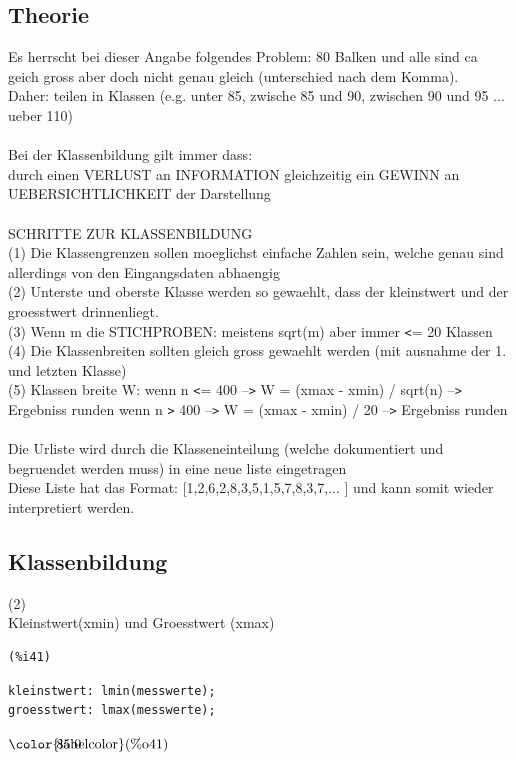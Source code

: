 \documentclass[12pt]{article}
\begin{document}
\subsection{Theorie}


Es herrscht bei dieser Angabe folgendes Problem: 80 Balken und alle sind ca geich gross aber doch nicht genau gleich (unterschied nach dem Komma). \\
Daher: teilen in Klassen (e.g. unter 85, zwische 85 und 90, zwischen 90 und 95 ... ueber 110)
\\ \\
Bei der Klassenbildung gilt immer dass: \\
    durch einen VERLUST an INFORMATION gleichzeitig ein GEWINN an UEBERSICHTLICHKEIT der Darstellung
\\ \\
SCHRITTE ZUR KLASSENBILDUNG \\
    (1) Die Klassengrenzen sollen moeglichst einfache Zahlen sein, welche genau sind allerdings von den Eingangsdaten abhaengig \\
    (2) Unterste und oberste Klasse werden so gewaehlt, dass der kleinstwert und der groesstwert drinnenliegt. \\
    (3) Wenn m die STICHPROBEN: meistens sqrt(m) aber immer \verb|<|= 20 Klassen \\
    (4) Die Klassenbreiten sollten gleich gross gewaehlt werden (mit ausnahme der 1. und letzten Klasse) \\
    (5) Klassen breite W:   wenn n \verb|<|= 400 --\verb|>| W = (xmax - xmin) / sqrt(n) --\verb|>| Ergebniss runden
                            wenn n \verb|>| 400 --\verb|>| W = (xmax - xmin) / 20 --\verb|>| Ergebniss runden
\\ \\
Die Urliste wird durch die Klasseneinteilung (welche dokumentiert und begruendet werden muss) in eine neue liste eingetragen \\
Diese Liste hat das Format: [1,2,6,2,8,3,5,1,5,7,8,3,7,... ] und kann somit wieder interpretiert werden.

\subsection{Klassenbildung}


(2) \\
Kleinstwert(xmin) und Groesstwert (xmax)

\noindent
\begin{minipage}[t]{8ex}{\color{red}\bf
\begin{verbatim}
(%i41) 
\end{verbatim}}
\end{minipage}
\begin{minipage}[t]{\textwidth}{\color{blue}
\begin{verbatim}
kleinstwert: lmin(messwerte);
groesstwert: lmax(messwerte);
\end{verbatim}}
\end{minipage}
\begin{math}\displaystyle
\parbox{8ex}{\color{labelcolor}(\%o41) }
85.0
\end{math}
\end{document}
